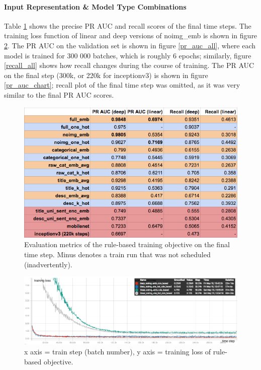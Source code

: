 \paragraph{Input Representation \& Model Type Combinations}

Table \ref{metrics_all} shows the precise PR AUC and recall scores of the final time steps.
The training loss function of linear and deep versions of noimg\_emb is shown in figure \ref{train_loss_all}.
The PR AUC on the validation set is shown in figure \ref{pr_auc_all}, where each model is trained for 300 000 batches, which is roughly 6 epochs; similarly, figure \ref{recall_all} shows how recall changes during the course of training.
The PR AUC on the final step (300k, or 220k for inceptionv3) is shown in figure \ref{pr_auc_chart}; recall plot of the final time step was omitted, as it was very similar to the final PR AUC scores.

\begin{figure}
  \includegraphics[width=\linewidth]{figures/metrics_all}
  \caption{Evaluation metrics of the rule-based training objective on the final time step. Minus denotes a train run that was not scheduled (inadvertently).}
  \label{metrics_all}
\end{figure}

\begin{figure}
  \includegraphics[width=\linewidth]{figures/train_loss_all}
  \caption{x axis = train step (batch number), y axis = training loss of rule-based objective.}
  \label{train_loss_all}
\end{figure}

